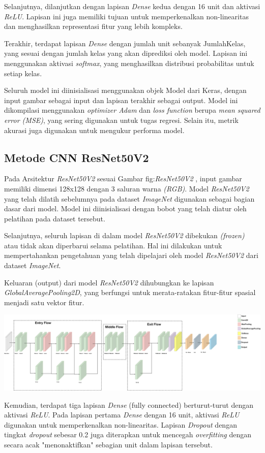 Selanjutnya, dilanjutkan dengan lapisan \textit{Dense} kedua dengan 16 unit dan aktivasi \textit{ReLU}. Lapisan ini juga memiliki tujuan untuk memperkenalkan non-linearitas dan menghasilkan representasi fitur yang lebih kompleks.

Terakhir, terdapat lapisan \textit{Dense} dengan jumlah unit sebanyak JumlahKelas, yang sesuai dengan jumlah kelas yang akan diprediksi oleh model. Lapisan ini menggunakan aktivasi \textit{softmax}, yang menghasilkan distribusi probabilitas untuk setiap kelas.

Seluruh model ini diinisialisasi menggunakan objek Model dari Keras, dengan input gambar sebagai input dan lapisan terakhir sebagai output. Model ini dikompilasi menggunakan \textit{optimizer Adam} dan \textit{loss function} berupa\textit{ mean squared error (MSE)}, yang sering digunakan untuk tugas regresi. Selain itu, metrik akurasi juga digunakan untuk mengukur performa model.

\subsection{Metode CNN ResNet50V2}

Pada Arsitektur \textit{ResNet50V2} sesuai Gambar {fig:\textit{ResNet50V2}} , input gambar memiliki dimensi 128x128 dengan 3 saluran warna \textit{(RGB)}. Model \textit{ResNet50V2} yang telah dilatih sebelumnya pada dataset \textit{ImageNet} digunakan sebagai bagian dasar dari model. Model ini diinisialisasi dengan bobot yang telah diatur oleh pelatihan pada dataset tersebut.

Selanjutnya, seluruh lapisan di dalam model \textit{ResNet50V2} dibekukan \textit{(frozen)} atau tidak akan diperbarui selama pelatihan. Hal ini dilakukan untuk mempertahankan pengetahuan yang telah dipelajari oleh model \textit{ResNet50V2} dari dataset \textit{ImageNet}.

Keluaran (output) dari model \textit{ResNet50V2} dihubungkan ke lapisan \textit{GlobalAveragePooling2D}, yang berfungsi untuk merata-ratakan fitur-fitur spasial menjadi satu vektor fitur.
\begin{center}
	\includegraphics[width=1.1\linewidth]{gambar/bener/Arsitektur_ModelCNNResNet50v2_Modifikasi.png}
	\label{fig:textitResNet50V2}
\end{center}
Kemudian, terdapat tiga lapisan \textit{Dense} (fully connected) berturut-turut dengan aktivasi \textit{ReLU}. Pada lapisan pertama \textit{Dense} dengan 16 unit, aktivasi \textit{ReLU} digunakan untuk memperkenalkan non-linearitas. Lapisan \textit{Dropout} dengan tingkat \textit{dropout} sebesar 0.2 juga diterapkan untuk mencegah \textit{overfitting} dengan secara acak "menonaktifkan" sebagian unit dalam lapisan tersebut.

